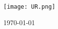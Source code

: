 \begin{titlepage}
	
	\vfill\vfill\vfill\vfill
	\texttt{[image: UR.png]}\\[2cm] %
	 

	
	\vfill\vfill\vfill %
	
	{\large\today} %
	
	
	\vfill %
	
\end{titlepage}



\newpage 
\tableofcontents

\newpage
\listoffigures
\newpage
